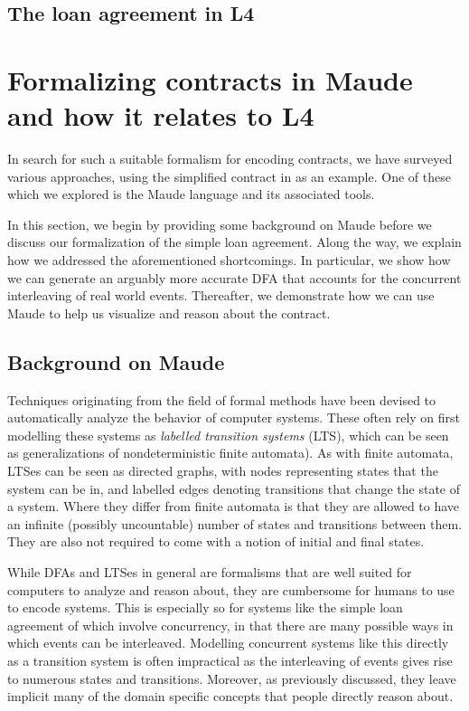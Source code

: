 \documentclass{article}
\begin{document}
\subsection{The loan agreement in L4}

\section{Formalizing contracts in Maude and how it relates to L4}

In search for such a suitable formalism for encoding contracts,
we have surveyed various approaches, using the simplified contract in
\cite[Fig 1.]{contract_as_automaton} as an example.
One of these which we explored is the Maude language and its associated tools.

In this section, we begin by providing some background on Maude before
we discuss our formalization of the simple loan agreement.
Along the way, we explain how we addressed the aforementioned shortcomings.
In particular, we show how we can generate an arguably more accurate DFA that
accounts for the concurrent interleaving of real world events.
Thereafter, we demonstrate how we can use Maude to help us
visualize and reason about the contract.

\subsection{Background on Maude}
Techniques originating from the field of formal methods have been devised to
automatically analyze the behavior of computer systems.
These often rely on first modelling these systems as
\textit{labelled transition systems} (LTS), which can be seen as
generalizations of nondeterministic finite automata).
As with finite automata, LTSes can be seen as directed graphs, with nodes
representing states that the system can be in, and labelled edges denoting
transitions that change the state of a system.
Where they differ from finite automata is that they are allowed to have an
infinite (possibly uncountable) number of states and transitions
between them.
They are also not required to come with a notion of initial and final states.

While DFAs and LTSes in general are formalisms that are well suited for
computers to analyze and reason about, they are cumbersome for humans to use
to encode systems.
This is especially so for systems like the simple loan agreement of
\cite{contract_as_automaton} which involve concurrency, in that there are
many possible ways in which events can be interleaved.
Modelling concurrent systems like this directly as a transition system is
often impractical as the interleaving of events gives rise to numerous states
and transitions.
Moreover, as previously discussed, they leave implicit many of the domain
specific concepts that people directly reason about.
\end{document}
